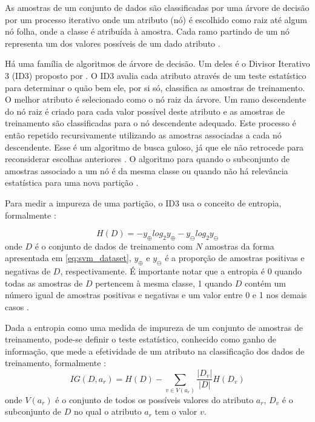 As amostras de um conjunto de dados são classificadas por uma árvore de decisão por um processo iterativo onde um atributo (nó) é escolhido como raiz até algum nó folha, onde a classe é atribuída à amostra. Cada ramo partindo de um nó representa um dos valores possíveis de um dado atributo \citep{mitchell:97}.

Há uma família de algoritmos de árvore de decisão. Um deles é o Divisor Iterativo 3 (ID3) proposto por \citet{quinlan:86}. O ID3 avalia cada atributo através de um teste estatístico para determinar o quão bem ele, por si só, classifica as amostras de treinamento. O melhor atributo é selecionado como o nó raiz da árvore. Um ramo descendente do nó raiz é criado para cada valor possível deste atributo e as amostras de treinamento são classificadas para o nó descendente adequado. Este processo é então repetido recursivamente utilizando as amostras associadas a cada nó descendente. Esse é um algoritmo de busca guloso, já que ele não retrocede para reconsiderar escolhas anteriores \citep{mitchell:97}. O algoritmo para quando o subconjunto de amostras associado a um nó é da mesma classe ou quando não há relevância estatística para uma nova partição \citep{quinlan:86}.

Para medir a impureza de uma partição, o ID3 usa o conceito de entropia, formalmente \citep{quinlan:86}:

\begin{equation}
\label{eq:arvore_devisao_entropia}
H(D) = - y_\oplus log_2 y_\oplus - y_\ominus log_2 y_\ominus
\end{equation}
\noindent onde $D$ é o conjunto de dados de treinamento com $N$ amostras da forma apresentada em \ref{eq:svm_dataset}, $y_\oplus$ e $y_\ominus$ é a proporção de amostras positivas e negativas de $D$, respectivamente. É importante notar que a entropia é 0 quando todas as amostras de $D$ pertencem à mesma classe, 1 quando $D$ contém um número igual de amostras positivas e negativas e um valor entre 0 e 1 nos demais casos \citep{mitchell:97}.

Dada a entropia como uma medida de impureza de um conjunto de amostras de treinamento, pode-se definir o teste estatístico, conhecido como ganho de informação, que mede a efetividade de um atributo na classificação dos dados de treinamento, formalmente \citep{quinlan:86}:
\begin{equation}
\label{eq:arvore_devisao_ganho_informacao}
IG(D, a_r) = H(D) - \sum_{v \in V(a_r)} \frac{|D_v|}{|D|} H(D_v)
\end{equation}
\noindent onde $V(a_r)$ é o conjunto de todos os possíveis valores do atributo $a_r$, $D_v$ é o subconjunto de $D$ no qual o atributo $a_r$ tem o valor $v$.

